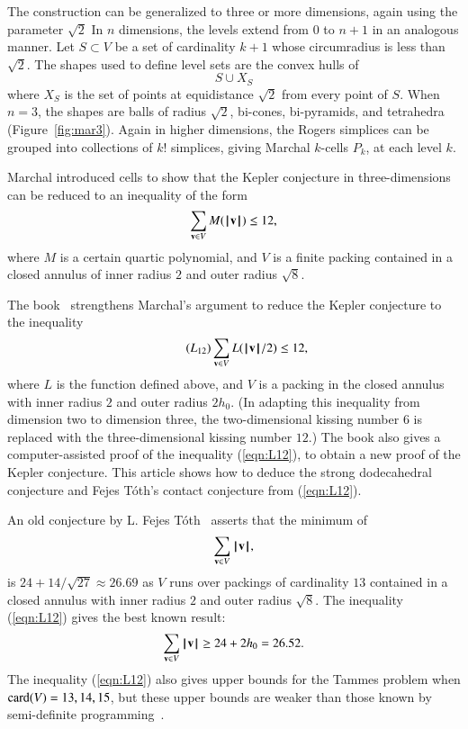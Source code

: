 \documentclass{llncs}
\begin{document}
The construction can be generalized to three or more dimensions,
again using the parameter $\sqrt2$   In $n$ dimensions, the levels extend
from $0$ to $n+1$ in an analogous manner.  Let $S\subset V$ be a set of
cardinality $k+1$ whose circumradius is less than $\sqrt2$.
The shapes used to define level sets are the convex hulls of
\[
S \cup X_S
\]
where $X_S$ is the set of points at equidistance $\sqrt2$ from every
point of $S$.  When $n=3$, the shapes are balls of radius $\sqrt2$,
bi-cones, bi-pyramids, and tetrahedra (Figure~\ref{fig:mar3}).  Again
in higher dimensions, the Rogers simplices can be grouped into
collections of $k!$ simplices, giving Marchal $k$-cells $P_k$, at each
level $k$.

\begin{remark} Marchal introduced cells to show that the Kepler
  conjecture in three-dimensions can be reduced to an inequality of
  the form
\[
\sum_{{\mathbf v}\in V} M({{\hskip0.1em|\hskip-0.15em|\hskip0.1em}{\mathbf v}{\hskip0.1em|\hskip-0.15em|\hskip0.1em}}) \le 12,
\]
where $M$ is a certain quartic polynomial, and $V$ is a finite packing 
contained in a closed annulus of inner radius $2$ and outer
radius $\sqrt8$.  
\end{remark}

\begin{remark}
The book~\cite{DSP} strengthens Marchal's argument to reduce
the Kepler conjecture to the inequality
\begin{equation}\label{eqn:L12}\tag{$L_{12}$}
\sum_{\v \in V} L(\normo{\v}/2) \le 12,
\end{equation}
where $L$ is the function defined above, and $V$ is a packing in the
closed annulus with inner radius $2$ and outer radius $2h_0$.  (In
adapting this inequality from dimension two to dimension three, the
two-dimensional kissing number $6$ is replaced with the
three-dimensional kissing number $12$.) The book also gives a
computer-assisted proof of the inequality (\ref{eqn:L12}), to obtain a
new proof of the Kepler conjecture.  This article shows how to deduce
the strong dodecahedral conjecture and Fejes T\'oth's contact
conjecture from (\ref{eqn:L12}).
\end{remark}

\begin{remark}
An old conjecture by L. Fejes
T\'oth~\cite[p.~178]{Toth:1972:Lagerungen} asserts that the minimum of
\begin{equation}\label{eqn:FT}
\sum_{{\mathbf v}\in V} {{\hskip0.1em|\hskip-0.15em|\hskip0.1em}{\mathbf v}{\hskip0.1em|\hskip-0.15em|\hskip0.1em}},
\end{equation}
is $24+ 14/\sqrt{27}\approx 26.69$
as $V$ runs over packings of cardinality $13$ contained in a closed
annulus with inner radius $2$ and outer radius $\sqrt8$.  The
inequality (\ref{eqn:L12}) gives the best known result:
\begin{equation}
\sum_{{\mathbf v}\in V} {{\hskip0.1em|\hskip-0.15em|\hskip0.1em}{\mathbf v}{\hskip0.1em|\hskip-0.15em|\hskip0.1em}}\ge 24 + 2 h_0 = 26.52.
\end{equation}
The inequality (\ref{eqn:L12}) also gives upper bounds for the Tammes
problem when ${\operatorname{card}}(V)=13,14,15$, but these upper bounds are weaker
than those known by semi-definite programming~\cite{BV08}.
\end{remark}
\end{document}
